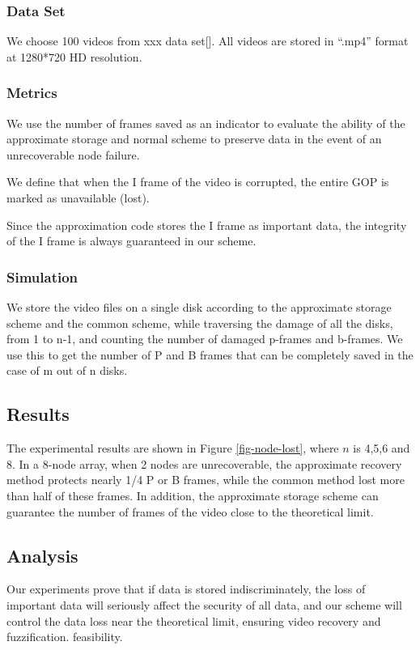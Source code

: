 \documentclass[sigconf]{acmart}
\begin{document}
\subsubsection{Data Set}
We choose 100 videos from xxx data set[]. All videos are stored in ``.mp4'' format at 1280*720 HD resolution.

\subsubsection{Metrics}
We use the number of frames saved as an indicator to evaluate the ability of the approximate storage and normal scheme to preserve data in the event of an unrecoverable node failure.

We define that when the I frame of the video is corrupted, the entire GOP is marked as unavailable (lost).

Since the approximation code stores the I frame as important data, the integrity of the I frame is always guaranteed in our scheme.

\subsubsection{Simulation}
We store the video files on a single disk according to the approximate storage scheme and the common scheme, while traversing the damage of all the disks, from 1 to n-1, and counting the number of damaged p-frames and b-frames. We use this to get the number of P and B frames that can be completely saved in the case of m out of n disks.

\subsection{Results}
The experimental results are shown in Figure \ref{fig-node-lost}, where $n$ is 4,5,6 and 8. In a 8-node array, when 2 nodes are unrecoverable, the approximate recovery method protects nearly 1/4 P or B frames, while the common method lost more than half of these frames. In addition, the approximate storage scheme can guarantee the number of frames of the video close to the theoretical limit.

\subsection{Analysis}
Our experiments prove that if data is stored indiscriminately, the loss of important data will seriously affect the security of all data, and our scheme will control the data loss near the theoretical limit, ensuring video recovery and fuzzification. feasibility.
\end{document}
